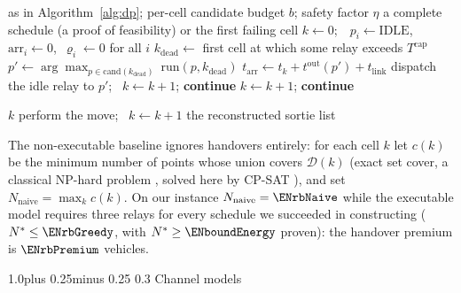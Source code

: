 \documentclass[11pt]{article}
\makeatletter
\def\subsection{\@startsection{subsection}{2}{\z@}%
    {1.0\baselineskip plus 0.25\baselineskip minus 0.25\baselineskip}%
    {0.3\baselineskip}%
    {\normalfont\normalsize\itshape}}%
\theoremstyle{dshplain}
\theoremstyle{dshdefn}
\makeatother
\begin{document}
\begin{algorithm}[htbp]
\caption{Constructive verifier for $N$ hovering relays}
\label{alg:greedy}
\begin{algorithmic}[1]
\Require as in Algorithm~\ref{alg:dp}; per-cell candidate budget $b$; safety factor $\eta$
\Ensure a complete schedule (a proof of feasibility) or the first failing cell
\State $k\gets0$;\ \ $p_i\gets\mathrm{IDLE}$,\ $\mathrm{arr}_i\gets0$,\ $\varrho_i\gets0$ for all $i$
    \State $k_{\mathrm{dead}}\gets$ first cell at which some relay exceeds $T^{\mathrm{cap}}$
    \label{line:pre}
      \State $p'\gets\arg\max_{p\in\mathrm{cand}(k_{\mathrm{dead}})}\ \mathrm{run}(p,k_{\mathrm{dead}})$
      \State $t_{\mathrm{arr}}\gets t_k+t^{\mathrm{out}}(p')+t_{\mathrm{link}}$
        \State dispatch the idle relay to $p'$; \ $k\gets k+1$; \textbf{continue}
      \EndIf
    \label{line:preend}
    \EndIf
    \State $k\gets k+1$; \textbf{continue}
  \EndIf
  \par
   \State \Return $k$ 
  \EndIf
  \State perform the move; \ $k\gets k+1$
\EndWhile
\State \Return the reconstructed sortie list
\end{algorithmic}
\end{algorithm}

\noindent The non-executable baseline ignores handovers entirely: for each cell $k$ let
$c(k)$ be the minimum number of points whose union covers $\mathcal{D}(k)$
(exact set cover, a classical NP-hard problem \cite{korte}, solved here by
CP-SAT \cite{cpsat}), and set
$N_{\mathrm{naive}}=\max_k c(k)$. On our instance $N_{\mathrm{naive}}=\ENrbNaive$
while the executable model requires three relays for every schedule we succeeded
in constructing ($N^{*}\le\ENrbGreedy$, with $N^{*}\ge\ENboundEnergy$ proven): the handover premium is
$\ENrbPremium$ vehicles.

\subsection{Channel models}
\label{sec:channel}
\end{document}
